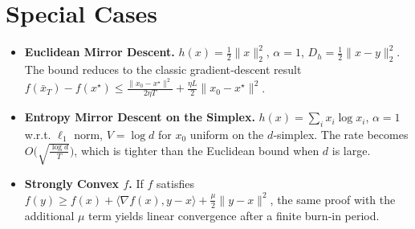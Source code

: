 \documentclass{article}
\newcommand{\inner}[2]{\langle #1,#2\rangle}
\newcommand{\grad}{\nabla}
\begin{document}
\section*{Special Cases}
\begin{itemize}
\item \textbf{Euclidean Mirror Descent.}
$h(x)=\tfrac12\|x\|_{2}^{2}$, $\alpha=1$, $D_{h}=\tfrac12\|x-y\|_{2}^{2}$.
The bound reduces to the classic gradient‑descent result
$f(\bar x_{T})-f(x^{\star})\le \frac{\|x_{0}-x^{\star}\|^{2}}{2\eta T}
+\frac{\eta L}{2}\|x_{0}-x^{\star}\|^{2}$.

\item \textbf{Entropy Mirror Descent on the Simplex.}
$h(x)=\sum_{i}x_{i}\log x_{i}$, $\alpha=1$ w.r.t. $\ell_{1}$ norm,
$V=\log d$ for $x_{0}$ uniform on the $d$‑simplex.
The rate becomes $O\!\bigl(\sqrt{\frac{\log d}{T}}\bigr)$,
which is tighter than the Euclidean bound when $d$ is large.

\item \textbf{Strongly Convex $f$.}
If $f$ satisfies $f(y)\ge f(x)+\inner{\grad f(x)}{y-x}+\frac{\mu}{2}\|y-x\|^{2}$,
the same proof with the additional $\mu$ term yields linear convergence
after a finite burn‑in period.
\end{itemize}

\end{document}
